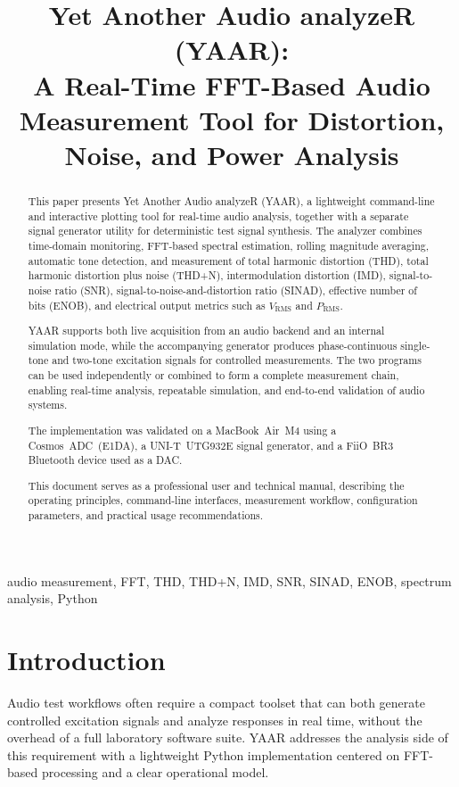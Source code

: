 \documentclass[conference]{IEEEtran}
\title{Yet Another Audio analyzeR (YAAR):\\
A Real-Time FFT-Based Audio Measurement Tool for Distortion, Noise, and Power Analysis}
\author{\IEEEauthorblockN{George Biro}
\IEEEauthorblockA{Independent Developer\\
GPLv3-or-later\\
Email: george.biro@gmail.com}}
\begin{document}
\maketitle

\begin{abstract}
This paper presents Yet Another Audio analyzeR (YAAR), a lightweight command-line and interactive plotting tool for real-time audio analysis, together with a separate signal generator utility for deterministic test signal synthesis. The analyzer combines time-domain monitoring, FFT-based spectral estimation, rolling magnitude averaging, automatic tone detection, and measurement of total harmonic distortion (THD), total harmonic distortion plus noise (THD+N), intermodulation distortion (IMD), signal-to-noise ratio (SNR), signal-to-noise-and-distortion ratio (SINAD), effective number of bits (ENOB), and electrical output metrics such as $V_{\mathrm{RMS}}$ and $P_{\mathrm{RMS}}$.

YAAR supports both live acquisition from an audio backend and an internal simulation mode, while the accompanying generator produces phase-continuous single-tone and two-tone excitation signals for controlled measurements. The two programs can be used independently or combined to form a complete measurement chain, enabling real-time analysis, repeatable simulation, and end-to-end validation of audio systems.

The implementation was validated on a \mbox{MacBook Air M4} using a \mbox{Cosmos ADC (E1DA)}, a \mbox{UNI-T UTG932E} signal generator, and a \mbox{FiiO BR3} Bluetooth device used as a DAC.

This document serves as a professional user and technical manual, describing the operating principles, command-line interfaces, measurement workflow, configuration parameters, and practical usage recommendations.
\end{abstract}

\begin{IEEEkeywords}
audio measurement, FFT, THD, THD+N, IMD, SNR, SINAD, ENOB, spectrum analysis, Python
\end{IEEEkeywords}

\section{Introduction}
Audio test workflows often require a compact toolset that can both generate controlled excitation signals and analyze responses in real time, without the overhead of a full laboratory software suite. YAAR addresses the analysis side of this requirement with a lightweight Python implementation centered on FFT-based processing and a clear operational model.
\end{document}
